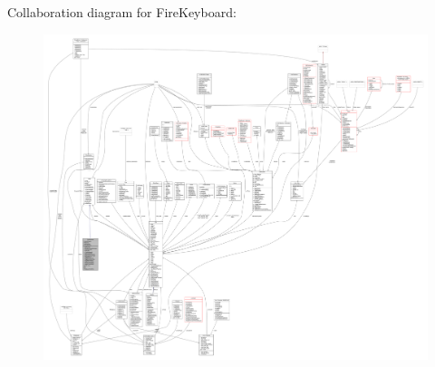 Collaboration diagram for Fire\+Keyboard\+:
\nopagebreak
\begin{figure}[H]
\begin{center}
\leavevmode
\includegraphics[width=350pt]{d1/d02/classFireKeyboard__coll__graph}
\end{center}
\end{figure}
